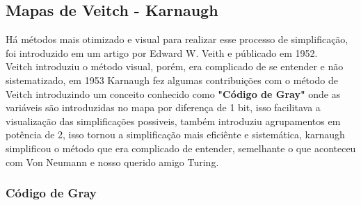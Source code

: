 \documentclass[12pt, onecolumn]{article}
\begin{document}
	\subsection{\centering Mapas de Veitch - Karnaugh}
	
	Há métodos mais otimizado e visual para realizar esse processo de 
	simplificação, foi introduzido em um artigo por Edward W. Veith e públicado 
	em 1952. \\
	\newline
	Veitch introduziu o método visual, porém, era complicado de se entender e 
	não sistematizado, em 1953 Karnaugh fez algumas contribuições com o método 
	de Veitch introduzindo um conceito conhecido como \textbf{"Código de Gray"}
	onde as variáveis são introduzidas no mapa por diferença de 1 bit, isso
	facilitava a visualização das simplificações possiveis, também introduziu
	agrupamentos em potência de 2, isso tornou a simplificação mais eficiênte
	e sistemática, karnaugh simplificou o método que era complicado de entender,
	semelhante o que aconteceu com Von Neumann e nosso querido amigo Turing. \\

	\subsubsection{\centering Código de Gray}
	
\end{document}
